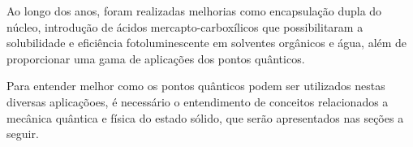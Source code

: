 \par Ao longo dos anos, foram realizadas melhorias como encapsulação dupla do núcleo, introdução de ácidos mercapto-carboxílicos que possibilitaram a solubilidade e eficiência fotoluminescente em solventes orgânicos e água, além de proporcionar uma gama de aplicações dos pontos quânticos.

\par Para entender melhor como os pontos quânticos podem ser utilizados nestas diversas aplicaçõoes, é necessário o entendimento de conceitos relacionados a mecânica quântica e física do estado sólido, que serão apresentados nas seções a seguir.